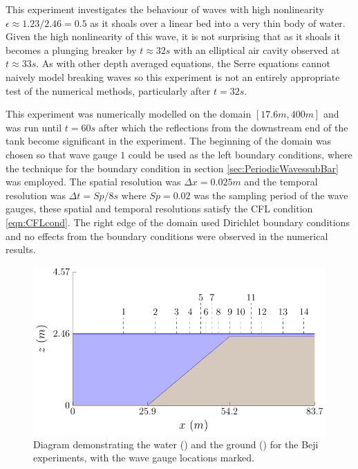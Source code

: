 This experiment investigates the behaviour of waves with high nonlinearity $ \epsilon \approx 1.23/2.46 = 0.5$ as it shoals over a linear bed into a very thin body of water. Given the high nonlinearity of this wave, it is not surprising that as it shoals it becomes a plunging breaker by $t \approx 32s$ with an elliptical air cavity observed at $t \approx 33s$. As with other depth averaged equations, the Serre equations cannot naively model breaking waves so this experiment is not an entirely appropriate test of the numerical methods, particularly after $t=32s$.

This experiment was numerically modelled on the domain $[17.6m , 400m]$ and was run until $t = 60s$ after which the reflections from the downstream end of the tank become significant in the experiment. The beginning of the domain was chosen so that wave gauge $1$ could be used as the left boundary conditions, where the technique for the boundary condition in section \ref{sec:PeriodicWavessubBar} was employed. The spatial resolution was $\Delta x = 0.025m$ and the temporal resolution was $\Delta t = Sp / 8 s$ where $Sp = 0.02$ was the sampling period of the wave gauges, these spatial and temporal resolutions satisfy the CFL condition \eqref{eqn:CFLcond}. The right edge of the domain used Dirichlet boundary conditions and no effects from the boundary conditions were observed in the numerical results. 



\begin{figure}
	\centering
	\includegraphics[width=\textwidth]{./chp6/figures/Experiment/Roeber/Trial8/WaveTank.pdf}
	\caption{Diagram demonstrating the water () and the ground  () for the Beji experiments, with the wave gauge locations marked.}
	\label{fig:RoeberWT}
\end{figure}

